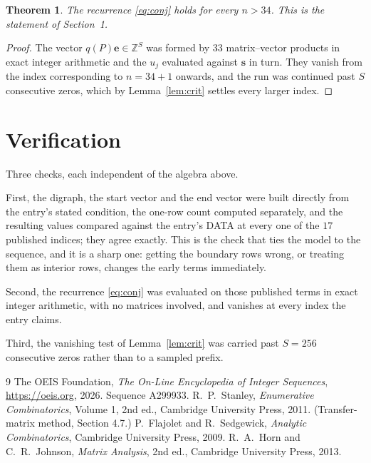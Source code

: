 \documentclass[11pt,a4paper]{article}
\theoremstyle{plain}
\newtheorem{theorem}{Theorem}
\theoremstyle{definition}
\begin{document}
\begin{theorem}
The recurrence \eqref{eq:conj} holds for every $n>34$. This is the statement of
Section~1.
\end{theorem}

\begin{proof}
The vector $q(P)\mathbf{e}\in\mathbb{Z}^{S}$ was formed by $33$ matrix--vector
products in exact integer arithmetic and the $u_j$ evaluated against $\mathbf{s}$ in turn.
They vanish from the index corresponding to $n=34+1$ onwards, and the run was continued
past $S$ consecutive zeros, which by Lemma~\ref{lem:crit} settles every larger index.
\end{proof}

\section{Verification}

Three checks, each independent of the algebra above.

First, the digraph, the start vector and the end vector were built directly from the
entry's stated condition, the one-row count computed separately, and the resulting values
compared against the entry's DATA at every one of the $17$ published indices; they
agree exactly. This is the check that ties the model to the sequence, and it is a sharp one:
getting the boundary rows wrong, or treating them as interior rows, changes the early terms
immediately.

Second, the recurrence \eqref{eq:conj} was evaluated on those published terms in exact
integer arithmetic, with no matrices involved, and vanishes at every index the entry claims.

Third, the vanishing test of Lemma~\ref{lem:crit} was carried past $S=256$ consecutive
zeros rather than to a sampled prefix.

\begin{thebibliography}{9}
 The OEIS Foundation, \emph{The On-Line Encyclopedia of Integer
Sequences}, \url{https://oeis.org}, 2026. Sequence A299933.
 R.~P.~Stanley, \emph{Enumerative Combinatorics}, Volume 1, 2nd ed.,
Cambridge University Press, 2011. (Transfer-matrix method, Section 4.7.)
 P.~Flajolet and R.~Sedgewick, \emph{Analytic Combinatorics}, Cambridge
University Press, 2009.
 R.~A.~Horn and C.~R.~Johnson, \emph{Matrix Analysis}, 2nd ed., Cambridge
University Press, 2013.
\end{thebibliography}
\end{document}
